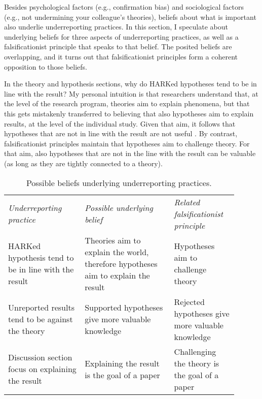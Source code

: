 \documentclass[authordate, meta]{jote-new-article}
\begin{document}
Besides psychological factors (e.g., confirmation bias) and sociological factors (e.g., not undermining your colleague's theories), beliefs about what is important also underlie underreporting practices. In this section, I speculate about underlying beliefs for three aspects of underreporting practices, as well as a falsificationist principle that speaks to that belief. The posited beliefs are overlapping, and it turns out that falsificationist principles form a coherent opposition to those beliefs.



In the theory and hypothesis sections, why do HARKed hypotheses tend to be in line with the result? My personal intuition is that researchers understand that, at the level of the research program, theories aim to explain phenomena, but that this gets mistakenly transferred to believing that also hypotheses aim to explain results, at the level of the individual study. Given that aim, it follows that hypotheses that are not in line with the result are not useful \parencite{Johns2019}. By contrast, falsificationist principles maintain that hypotheses aim to challenge theory. For that aim, also hypotheses that are not in the line with the result can be valuable (as long as they are tightly connected to a theory).


\begin{table}[t!]
  \begin{fullwidth}

    \caption{Possible beliefs underlying underreporting practices.}
    \label{tab:1}

    \begin{tabularx}{\columnwidth}{@{}>{\RaggedRight\arraybackslash}p{0.3\linewidth} >{\RaggedRight\arraybackslash}p{0.35\linewidth} >{\RaggedRight\arraybackslash}p{0.25\linewidth}@{}}

      \emph{Underreporting practice}                       &
      \emph{Possible underlying belief}                    & \emph{Related falsificationist principle}                                                                                            \\
      HARKed hypothesis tend to be in line with the result & Theories aim to explain the world, therefore hypotheses aim to explain the result & Hypotheses aim to challenge theory               \\
      Unreported results tend to be against the theory     & Supported hypotheses give more valuable knowledge                                 & Rejected hypotheses give more valuable knowledge \\
      Discussion section focus on explaining the result    & Explaining the result is the goal of a paper                                      & Challenging the theory is the goal of a paper    \\
    \end{tabularx}
  \end{fullwidth}


\end{table}
\end{document}
